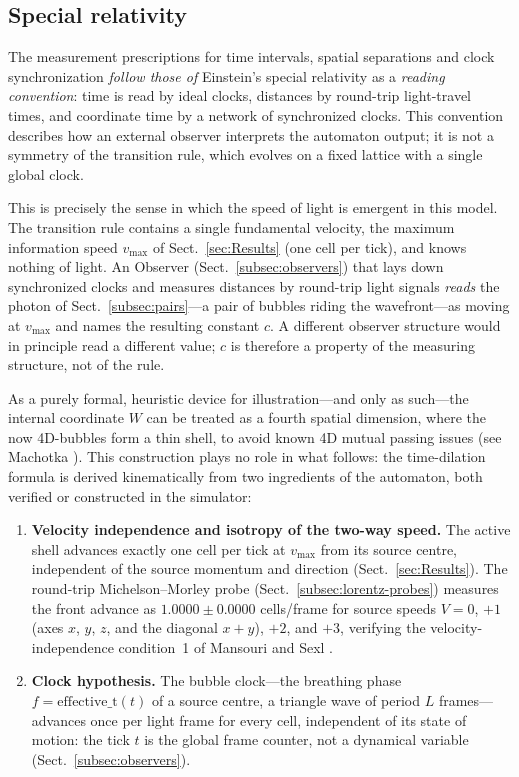 \documentclass{ijuc}
\begin{document}
\subsection{Special relativity}\label{subsec:special-relativity}
The measurement prescriptions for time intervals, spatial separations and clock synchronization \emph{follow those of} Einstein's special relativity \cite{Einstein1905} as a \emph{reading convention}: time is read by ideal clocks, distances by round-trip light-travel times, and coordinate time by a network of synchronized clocks. This convention describes how an external observer interprets the automaton output; it is not a symmetry of the transition rule, which evolves on a fixed lattice with a single global clock.

This is precisely the sense in which the speed of light is emergent in this model. The transition rule contains a single fundamental velocity, the maximum information speed $v_{\max}$ of Sect.~\ref{sec:Results} (one cell per tick), and knows nothing of light. An Observer (Sect.~\ref{subsec:observers}) that lays down synchronized clocks and measures distances by round-trip light signals \emph{reads} the photon of Sect.~\ref{subsec:pairs}---a pair of bubbles riding the wavefront---as moving at $v_{\max}$ and names the resulting constant $c$. A different observer structure would in principle read a different value; $c$ is therefore a property of the measuring structure, not of the rule.

As a purely formal, heuristic device for illustration---and only as such---the internal coordinate $W$ can be treated as a fourth spatial dimension, where the now 4D-bubbles form a thin shell, to avoid known 4D mutual passing issues (see Machotka \cite{Machotka2025}).  This construction plays no role in what follows: the time-dilation formula is derived kinematically from two ingredients of the automaton, both verified or constructed in the simulator:

\begin{enumerate}
  \item \textbf{Velocity independence and isotropy of the two-way speed.}  The active shell advances exactly one cell per tick at $v_{\max}$ from its source centre, independent of the source momentum and direction (Sect.~\ref{sec:Results}).  The round-trip Michelson--Morley probe (Sect.~\ref{subsec:lorentz-probes}) measures the front advance as $1.0000\pm0.0000$ cells/frame for source speeds $V=0$, $+1$ (axes $x$, $y$, $z$, and the diagonal $x{+}y$), $+2$, and $+3$, verifying the velocity-independence condition~1 of Mansouri and Sexl \cite{mansouri-sexl}.
  \item \textbf{Clock hypothesis.}  The bubble clock---the breathing phase $f=\mathrm{effective\_t}(t)$ of a source centre, a triangle wave of period $L$ frames---advances once per light frame for every cell, independent of its state of motion: the tick $t$ is the global frame counter, not a dynamical variable (Sect.~\ref{subsec:observers}).
\end{enumerate}
\end{document}
